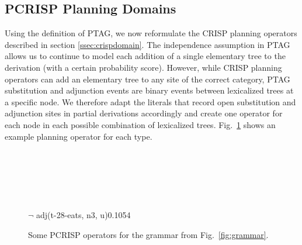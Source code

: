 \subsection{PCRISP Planning Domains}
\label{ssec:pcrisp-domains}
Using the definition of PTAG, we now reformulate the CRISP planning operators described in section \ref{ssec:crispdomain}.
The independence assumption in PTAG allows us to continue to model each addition of a single elementary tree to the derivation (with a certain probability score). However, while CRISP planning operators can add an elementary tree to any site of the correct category, PTAG substitution and adjunction events are binary events between lexicalized trees at a specific node. We therefore adapt the literals that record open substitution and adjunction sites in partial derivations accordingly and create one operator for each node in each possible combination of lexicalized trees.
Fig.~\ref{example-action} shows an example planning operator for each type.
\begin{figure}[t]
\begin{center}
\\\smallskip

\\\smallskip

\\\smallskip

{$\lnot$ adj(t-28-eats, n3, u)}{0.1054}\\\smallskip

\caption{\label{example-action} Some PCRISP operators for the grammar from Fig.~\ref{fig:grammar}.}
\end{center}
\end{figure}

